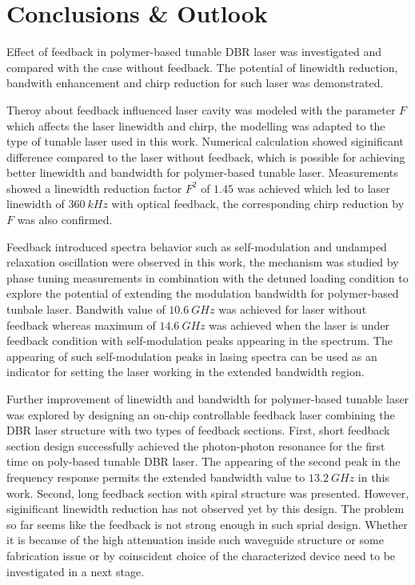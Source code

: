 
\chapter{Conclusions \& Outlook}\label{ch:Conclusion}
Effect of feedback in polymer-based tunable DBR laser was investigated and compared with the case without feedback. The potential of linewidth reduction, bandwith enhancement and chirp reduction for such laser was demonstrated.

Theroy about feedback influenced laser cavity was modeled with the parameter $F$ which affects the laser linewidth and chirp, the modelling was adapted to the type of tunable laser used in this work. Numerical calculation showed siginificant difference compared to the laser without feedback, which is possible for achieving better linewidth and bandwidth for polymer-based tunable laser. Measurements showed a linewidth reduction factor $F^2$ of $1.45$ was achieved which led to laser linewidth of $360 \ kHz$ with optical feedback, the corresponding chirp reduction by $F$ was also confirmed.

Feedback introduced spectra behavior such as self-modulation and undamped relaxation oscillation were observed in this work, the mechanism was studied by phase tuning measurements in combination with the detuned loading condition to explore the potential of extending the modulation bandwidth for polymer-based tunbale laser. Bandwith value of $10.6 \ GHz$ was achieved for laser without feedback whereas maximum of $14.6 \ GHz$ was achieved when the laser is under feedback condition with self-modulation peaks appearing in the spectrum. The appearing of such self-modulation peaks in lasing spectra can be used as an indicator for setting the laser working in the extended bandwidth region.

Further improvement of linewidth and bandwidth for polymer-based tunable laser was explored by designing an on-chip controllable feedback laser combining the DBR laser structure with two types of feedback sections. First, short feedback section design successfully achieved the photon-photon resonance for the first time on poly-based tunable DBR laser. The appearing of the second peak in the frequency response permits the extended bandwidth value to $13.2 \ GHz$ in this work. Second, long feedback section with spiral structure was presented. However, siginificant linewidth reduction has not observed yet by this design. The problem so far seems like the feedback is not strong enough in such sprial design. Whether it is because of the high attenuation inside such waveguide structure or some fabrication issue or by coinscident choice of the characterized device need to be investigated in a next stage.

